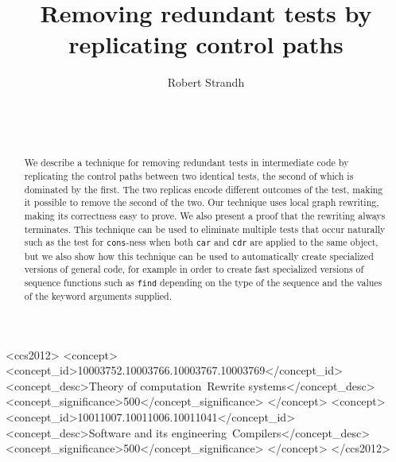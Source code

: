 \documentclass{sig-alternate-05-2015}
\def\inputtex#1{}
\begin{document}
\title{Removing redundant tests by replicating control paths}
\author{\alignauthor
Robert Strandh\\
\\
\\
\\
}

\maketitle

\begin{abstract}
We describe a technique for removing redundant tests in intermediate
code by replicating the control paths between two identical tests, the
second of which is dominated by the first.  The two replicas encode
different outcomes of the test, making it possible to remove the
second of the two.  Our technique uses local graph rewriting, making
its correctness easy to prove.  We also present a proof that the
rewriting always terminates.  This technique can be used to eliminate
multiple tests that occur naturally such as the test for
\texttt{cons}-ness when both \texttt{car} and \texttt{cdr} are applied
to the same object, but we also show how this technique can be used to
automatically create specialized versions of general code, for example
in order to create fast specialized versions of sequence functions
such as \texttt{find} depending on the type of the sequence and the
values of the keyword arguments supplied.
\end{abstract}

\begin{CCSXML}
<ccs2012>
<concept>
<concept_id>10003752.10003766.10003767.10003769</concept_id>
<concept_desc>Theory of computation~Rewrite systems</concept_desc>
<concept_significance>500</concept_significance>
</concept>
<concept>
<concept_id>10011007.10011006.10011041</concept_id>
<concept_desc>Software and its engineering~Compilers</concept_desc>
<concept_significance>500</concept_significance>
</concept>
</ccs2012>
\end{CCSXML}


\printccsdesc


\inputtex{sec-introduction.tex}
\inputtex{sec-previous.tex}
\inputtex{sec-our-method.tex}
\inputtex{sec-conclusions.tex}



\end{document}
